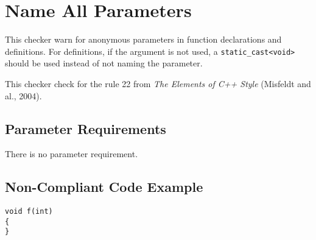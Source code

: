 %
%

\section{Name All Parameters}
\label{NameAllParameters::overview}

This checker warn for anonymous parameters in function declarations
and definitions. For definitions, if the argument is not used, a
\texttt{static\_cast<void>} should be used instead of not naming the
parameter.

This checker check for the rule 22 from \emph{The Elements of C++
Style} (Misfeldt and al., 2004).

\subsection{Parameter Requirements}

There is no parameter requirement.

\subsection{Non-Compliant Code Example}

\begin{verbatim}
void f(int)
{
}
\end{verbatim}


